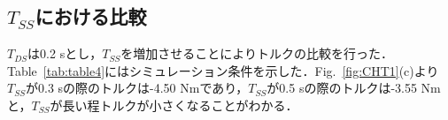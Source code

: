 \documentclass[twocolumn]{jsarticle}
\begin{document}
\subsection{$T_{SS}$における比較}
$T_{DS}$は0.2 sとし，$T_{SS}$を増加させることによりトルクの比較を行った．Table~\ref{tab:table4}にはシミュレーション条件を示した．Fig.~\ref{fig:CHT1}(c)より$T_{SS}$が0.3 sの際のトルクは-4.50 Nmであり，$T_{SS}$が0.5 sの際のトルクは-3.55 Nmと，$T_{SS}$が長い程トルクが小さくなることがわかる．

\end{document}

